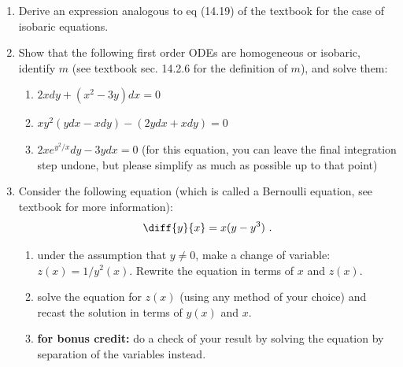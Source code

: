 \documentclass[fleqn]{article}
\begin{document}
  \begin{enumerate}

    \item  Derive an expression analogous to eq (14.19) of the textbook for the case of isobaric equations. 
    
    
    \item  Show that the following first order ODEs are homogeneous or isobaric, identify $m$ (see textbook sec. 14.2.6 for the definition of $m$), and solve them:
    \begin{enumerate}
    \item $2x dy + (x^2 - 3 y) dx=0$
    
    \item $x y^2 (y dx - x dy)-(2y dx + x dy)=0$
    
    \item $2x e^{y^2/x} dy - 3y dx=0$ (for this equation, you can leave the final integration step undone, but please simplify as much as possible up to that point)
    \end{enumerate}
    
    
    \item  Consider the following equation (which is called a Bernoulli equation, see textbook for more information): 
    \begin{equation}
    \diff{y}{x} = x  (y - y^3)~.
    \nonumber
    \end{equation}
    \begin{enumerate}
    \item under the assumption that $y\neq 0$, make a change of variable: $z(x)=1/y^2(x)$. Rewrite the equation in terms of $x$ and $z(x)$.
    
    \item solve the equation for $z(x)$ (using any method of your choice) and recast the solution in terms of $y(x)$ and $x$. 
    
    \item {\bf for bonus credit: } do a check of your result by solving the equation by separation of the variables instead. 
    \end{enumerate}
    
    \end{enumerate}
\end{document}
